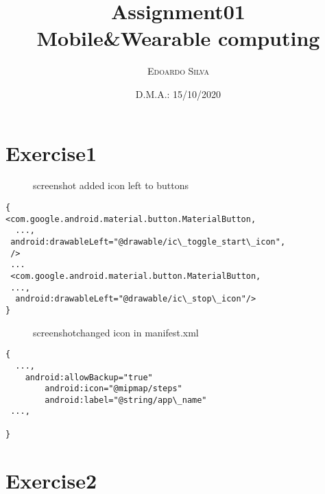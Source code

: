 \documentclass[11pt, english]{article}
\title{Assignment01 \\ Mobile\&Wearable computing}
\date{D.M.A.: 15/10/2020}
\author{
    \textsc{Edoardo Silva}
}
\begin{document}
\maketitle

\section*{Exercise1}

\begin{figure}[H]
  \caption{screenshot added icon left to buttons}
  \label{fig:ui\_add\_buttons}
\end{figure}


\begin{lstlisting}[basicstyle=\small\ttfamily,caption=screenshot added icon left to buttons]
{
<com.google.android.material.button.MaterialButton,
  ...,
 android:drawableLeft="@drawable/ic\_toggle_start\_icon",
 />
 ...
 <com.google.android.material.button.MaterialButton,
 ...,
  android:drawableLeft="@drawable/ic\_stop\_icon"/>
}
\end{lstlisting}

\begin{figure}[H]
  \caption{screenshotchanged icon in manifest.xml}
  \label{fig:ui\_change\_icon}
\end{figure}

\begin{lstlisting}[basicstyle=\small\ttfamily,caption=screenshot changed app icon]
{
  ...,
	android:allowBackup="true"
        android:icon="@mipmap/steps"
        android:label="@string/app\_name"
 ...,

}
\end{lstlisting}

\newpage

\section*{Exercise2}
\end{document}
